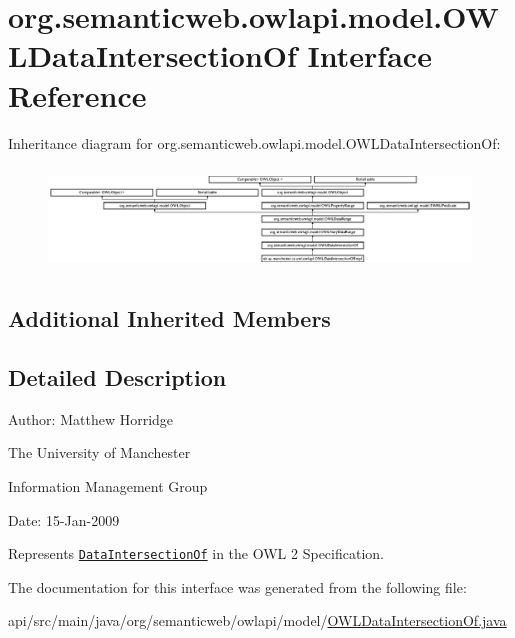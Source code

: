 \hypertarget{interfaceorg_1_1semanticweb_1_1owlapi_1_1model_1_1_o_w_l_data_intersection_of}{\section{org.\-semanticweb.\-owlapi.\-model.\-O\-W\-L\-Data\-Intersection\-Of Interface Reference}
\label{interfaceorg_1_1semanticweb_1_1owlapi_1_1model_1_1_o_w_l_data_intersection_of}
}
Inheritance diagram for org.\-semanticweb.\-owlapi.\-model.\-O\-W\-L\-Data\-Intersection\-Of\-:\begin{figure}[H]
\begin{center}
\leavevmode
\includegraphics[height=2.729805cm]{interfaceorg_1_1semanticweb_1_1owlapi_1_1model_1_1_o_w_l_data_intersection_of}
\end{center}
\end{figure}
\subsection*{Additional Inherited Members}


\subsection{Detailed Description}
Author\-: Matthew Horridge\par
 The University of Manchester\par
 Information Management Group\par
 Date\-: 15-\/\-Jan-\/2009 

Represents \href{http://www.w3.org/TR/2009/REC-owl2-syntax-20091027/#Intersection_of_Data_Ranges}{\tt Data\-Intersection\-Of} in the O\-W\-L 2 Specification. 

The documentation for this interface was generated from the following file\-:\begin{DoxyCompactItemize}
\item 
api/src/main/java/org/semanticweb/owlapi/model/\hyperlink{_o_w_l_data_intersection_of_8java}{O\-W\-L\-Data\-Intersection\-Of.\-java}\end{DoxyCompactItemize}
